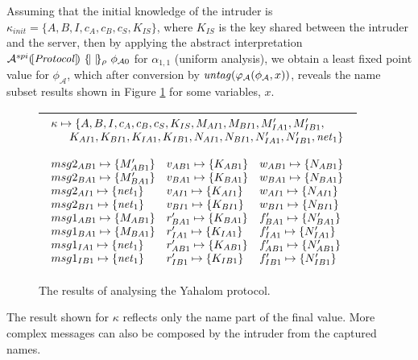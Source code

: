 \documentclass[10pt,a4paper,final,oneside,fleqn]{book}
\begin{document}
Assuming that the initial knowledge of the intruder is $\kappa_{init}=\{A,B,I,c_A,c_B,c_S,K_{IS}\}$, where $K_{IS}$ is the key shared between the intruder and the server, then by applying the abstract interpretation $\mathcal{A}^{spi}(\![\mbox{{\itshape Protocol\/}}]\!)~\{\!|~|\!\}_\rho~\phi_{\mathcal{A}0}$ for $\alpha_{1,1}$ (uniform analysis), we obtain a least fixed point value for $\phi_\mathcal{A}$, which after conversion by $\mbox{{\itshape untag\/}}(\varphi_\mathcal{A}(\phi_\mathcal{A},x))$, reveals the name subset results shown in Figure \ref{anyahalom} for some variables, $x$.
\begin{figure}[bht]
\begin{center}
\begin{tabular}{|l|}
\hline
$\begin{array}{lll}
\multicolumn{3}{l}{\kappa\mapsto\{A,B,I,c_A,c_B,c_S,K_{IS},M_{AI1},M_{BI1},M'_{IA1},M'_{IB1},}\\
\multicolumn{3}{l}{\hfill K_{AI1},K_{BI1},K_{IA1},K_{IB1},N_{AI1}, N_{BI1}, N'_{IA1}, N'_{IB1},\mbox{{\itshape net\/}}_1\}}\\\\
msg2_{AB1}\mapsto\{M'_{AB1}\}&v_{AB1}\mapsto\{K_{AB1}\}&w_{AB1}\mapsto\{N_{AB1}\}\\
msg2_{BA1}\mapsto\{M'_{BA1}\}&v_{BA1}\mapsto\{K_{BA1}\}&w_{BA1}\mapsto\{N_{BA1}\}\\
msg2_{AI1}\mapsto\{\mbox{{\itshape net\/}}_1\}&v_{AI1}\mapsto\{K_{AI1}\}&w_{AI1}\mapsto\{N_{AI1}\}\\
msg2_{BI1}\mapsto\{\mbox{{\itshape net\/}}_1\}&v_{BI1}\mapsto\{K_{BI1}\}&w_{BI1}\mapsto\{N_{BI1}\}\\
msg1_{AB1}\mapsto\{M_{AB1}\}&r'_{BA1}\mapsto\{K_{BA1}\}&f'_{BA1}\mapsto\{N'_{BA1}\}\\
msg1_{BA1}\mapsto\{M_{BA1}\}&r'_{IA1}\mapsto\{K_{IA1}\}&f'_{IA1}\mapsto\{N'_{IA1}\}\\
msg1_{IA1}\mapsto\{\mbox{{\itshape net\/}}_1\}&r'_{AB1}\mapsto\{K_{AB1}\}&f'_{AB1}\mapsto\{N'_{AB1}\}\\
msg1_{IB1}\mapsto\{\mbox{{\itshape net\/}}_1\}&r'_{IB1}\mapsto\{K_{IB1}\}&f'_{IB1}\mapsto\{N'_{IB1}\}\\
\end{array}$\\
\hline
\end{tabular}
\end{center}
\caption{The results of analysing the Yahalom protocol.\label{anyahalom}}
\end{figure}
The result shown for $\kappa$ reflects only the name part of the final value.  More complex messages can also be composed by the intruder from the captured names.
\end{document}
